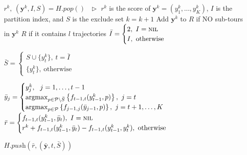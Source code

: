 \begin{algorithm}[htbp]
\begin{algorithmic}[1]
    \STATE $r^k,~ (\mathbf{y}^k, I, S) = H.\textit{pop}()~~~ \triangleright$ 
           $r^k$ is the score of $\mathbf{y}^k=(y_1^k,\dots,y_K^k)$, $I$ is the partition index, and $S$ is the exclude set
    \STATE $k = k + 1$
    \STATE Add $\mathbf{y}^k$ to $R$ if NO sub-tours in $\mathbf{y}^k$
    \RETURN $R$ if it contains $l$ trajectories
    \STATE $\bar{I} = \begin{cases}
                      2,~ I = \textsc{nil} \\
                      I,~ \text{otherwise}
                      \end{cases}$

        \STATE $\bar{S} = \begin{cases}
                          S \cup \{ y_t^k \},~ t = \bar{I} \\
                          \{ y_t^k \},~ \text{otherwise}
                          \end{cases}$

        \STATE $\bar{y}_j = \begin{cases}
                            y_j^k,~~ j=1,\dots,t-1 \\
                            \operatorname*{argmax}_{p \in \mathcal{P} \setminus \bar{S}} \left\{ f_{t-1,t}(y_{t-1}^k, p) \right\},~ j=t \\
                            \operatorname*{argmax}_{p \in \mathcal{P}} \left\{ f_{j-1, j}(\bar{y}_{j-1}, p) \right\},~ j=t+1,\dots,K
                \end{cases}$
        \STATE $\bar{r} = \begin{cases}
                          f_{t-1,t}(y_{t-1}^k, \bar{y}_t),~ I = \textsc{nil} \\
                          r^k + f_{t-1,t}(y_{t-1}^k, \bar{y}_t) - f_{t-1,t}(y_{t-1}^k, y_t^k),~ \text{otherwise}
                          \end{cases}$

        $H.\textit{push}\left(\bar{r}, (\bar{\mathbf{y}}, t, \bar{S}) \right)$
    \ENDFOR
\ENDWHILE
\end{algorithmic}
\end{algorithm}
 


